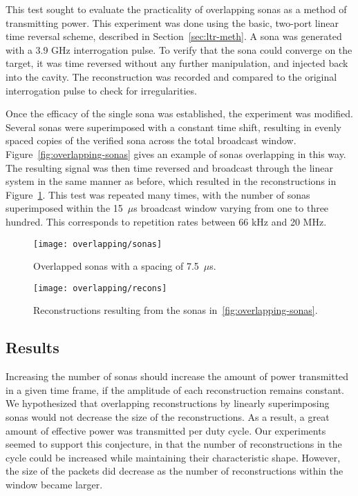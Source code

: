 This test sought to evaluate the practicality of overlapping sonas as a method of transmitting power. This experiment was done using the basic, two-port linear time reversal scheme, described in Section~\ref{sec:ltr-meth}. A sona was generated with a 3.9 GHz interrogation pulse. To verify that the sona could converge on the target, it was time reversed without any further manipulation, and injected back into the cavity. The reconstruction was recorded and compared to the original interrogation pulse to check for irregularities.

Once the efficacy of the single sona was established, the experiment was modified. Several sonas were superimposed with a constant time shift, resulting in evenly spaced copies of the verified sona across the total broadcast window. Figure~\ref{fig:overlapping-sonas} gives an example of sonas overlapping in this way. The resulting signal was then time reversed and broadcast through the linear system in the same manner as before, which resulted in the reconstructions in Figure~\ref{fig:overlapping-recons}. This test was repeated many times, with the number of sonas superimposed within the 15~$\mu$s broadcast window varying from one to three hundred. This corresponds to repetition rates between 66 kHz and 20 MHz.

\begin{figure}
\centering
\texttt{[image: overlapping/sonas]}
\caption[Overlapped sonas]{Overlapped sonas with a spacing of 7.5~$\mu$s.}
\label{fig:overlapping-sonas}

\vspace*{\floatsep}%

\texttt{[image: overlapping/recons]}
\caption[Overlapped reconstructions]{Reconstructions resulting from the sonas in~\ref{fig:overlapping-sonas}.}
\label{fig:overlapping-recons}
\end{figure}


\subsection{Results}

Increasing the number of sonas should increase the amount of power transmitted in a given time frame, if the amplitude of each reconstruction remains constant. We hypothesized that overlapping reconstructions by linearly superimposing sonas would not decrease the size of the reconstructions. As a result, a great amount of effective power was transmitted per duty cycle. Our experiments seemed to support this conjecture, in that the number of reconstructions in the cycle could be increased while maintaining their characteristic shape. However, the size of the packets did decrease as the number of reconstructions within the window became larger.

